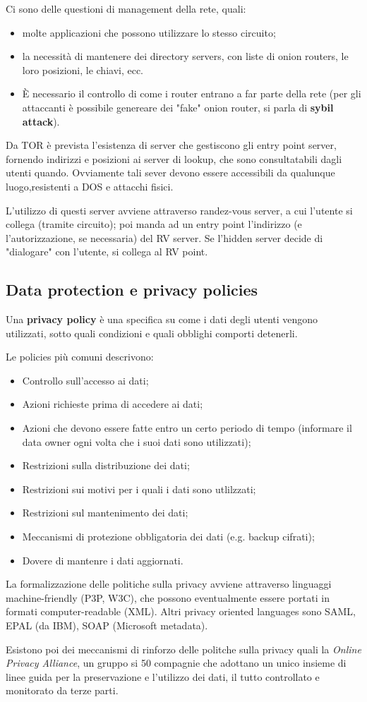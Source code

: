 \documentclass[a4paper, 10pt, twoside]{article}
\begin{document}
	Ci sono delle questioni di management della rete, quali: \begin{itemize}
		\item molte applicazioni che possono utilizzare lo stesso circuito;
		\item la necessità di mantenere dei directory servers, con liste di onion routers, le loro posizioni, le chiavi, ecc.
		\item È necessario il controllo di come i router entrano a far parte della rete (per gli attaccanti è possibile genereare dei "fake" onion router, si parla di \textbf{sybil attack}).
	\end{itemize}

	Da TOR è prevista l'esistenza di server che gestiscono gli entry point server, fornendo indirizzi e posizioni ai server di lookup, che sono consultatabili dagli utenti quando. Ovviamente tali sever devono essere accessibili da qualunque luogo,resistenti a DOS e attacchi fisici.

	L'utilizzo di questi server avviene attraverso randez-vous server, a cui l'utente si collega (tramite circuito); poi manda ad un entry point l'indirizzo (e l'autorizzazione, se necessaria) del RV server. Se l'hidden server decide di "dialogare" con l'utente, si collega al RV point.

	\subsection{Data protection e privacy policies}
	Una \textbf{privacy policy} è una specifica su come i dati degli utenti vengono utilizzati, sotto quali condizioni e quali obblighi comporti detenerli.

	Le policies più comuni descrivono: \begin{itemize}
		\item Controllo sull'accesso ai dati;
		\item Azioni richieste prima di accedere ai dati;
		\item Azioni che devono essere fatte entro un certo periodo di tempo (informare il data owner ogni volta che i suoi dati sono utilizzati);
		\item Restrizioni sulla distribuzione dei dati;
		\item Restrizioni sui motivi per i quali i dati sono utlilzzati;
		\item Restrizioni sul mantenimento dei dati;
		\item Meccanismi di protezione obbligatoria dei dati (e.g. backup cifrati);
		\item Dovere di mantenre i dati aggiornati.
	\end{itemize}

	La formalizzazione delle politiche sulla privacy avviene attraverso linguaggi machine-friendly (P3P, W3C), che possono eventualmente essere portati in formati computer-readable (XML).
	Altri privacy oriented languages sono SAML, EPAL (da IBM), SOAP (Microsoft metadata).

	Esistono poi dei meccanismi di rinforzo delle politche sulla privacy quali la \textit{Online Privacy Alliance}, un gruppo si 50 compagnie che adottano un unico insieme di linee guida per la preservazione e l'utilizzo dei dati, il tutto controllato e monitorato da terze parti.
\end{document}

